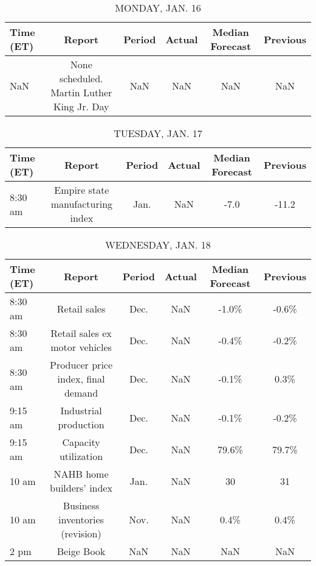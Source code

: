 \documentclass{article}%
\begin{document}
%
\normalsize%


\begin{table}[htbp]%
\caption{MONDAY, JAN. 16}%
\centering%
\begin{adjustbox}{width=1\textwidth}%
\begin{tabular}{lccccc}
\toprule
Time (ET) &                                     Report & Period & Actual & Median Forecast & Previous \\
\midrule
      NaN & None scheduled. Martin Luther King Jr. Day &    NaN &    NaN &             NaN &      NaN \\
\bottomrule
\end{tabular}
%
\end{adjustbox}%
\end{table}

%


\begin{table}[htbp]%
\caption{TUESDAY, JAN. 17}%
\centering%
\begin{adjustbox}{width=1\textwidth}%
\begin{tabular}{lccccc}
\toprule
Time (ET) &                           Report & Period & Actual & Median Forecast & Previous \\
\midrule
  8:30 am & Empire state manufacturing index &   Jan. &    NaN &            -7.0 &    -11.2 \\
\bottomrule
\end{tabular}
%
\end{adjustbox}%
\end{table}

%


\begin{table}[htbp]%
\caption{WEDNESDAY, JAN. 18}%
\centering%
\begin{adjustbox}{width=1\textwidth}%
\begin{tabular}{lccccc}
\toprule
Time (ET) &                             Report & Period & Actual & Median Forecast & Previous \\
\midrule
  8:30 am &                       Retail sales &   Dec. &    NaN &           -1.0\% &    -0.6\% \\
  8:30 am &     Retail sales ex motor vehicles &   Dec. &    NaN &           -0.4\% &    -0.2\% \\
  8:30 am & Producer price index, final demand &   Dec. &    NaN &           -0.1\% &     0.3\% \\
  9:15 am &              Industrial production &   Dec. &    NaN &           -0.1\% &    -0.2\% \\
  9:15 am &               Capacity utilization &   Dec. &    NaN &           79.6\% &    79.7\% \\
    10 am &          NAHB home builders' index &   Jan. &    NaN &              30 &       31 \\
    10 am &    Business inventories (revision) &   Nov. &    NaN &            0.4\% &     0.4\% \\
     2 pm &                         Beige Book &    NaN &    NaN &             NaN &      NaN \\
\bottomrule
\end{tabular}
%
\end{adjustbox}%
\end{table}
\end{document}
